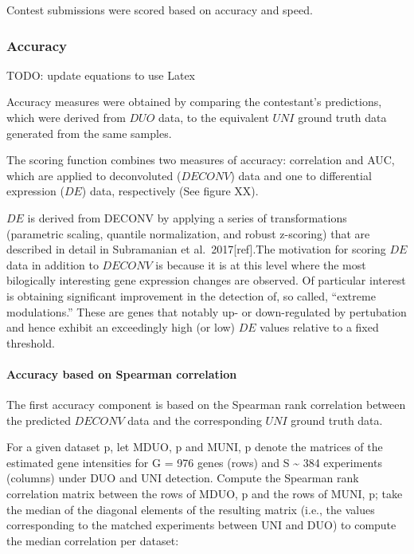 \documentclass[]{article}
\let\oldparagraph\paragraph
\renewcommand{\paragraph}[1]{\oldparagraph{#1}\mbox{}}
\begin{document}
Contest submissions were scored based on accuracy and speed.

\hypertarget{accuracy}{%
\subsubsection{Accuracy}\label{accuracy}}

\color{red}

TODO: update equations to use Latex \color{black}

Accuracy measures were obtained by comparing the contestant's
predictions, which were derived from \(DUO\) data, to the equivalent
\(UNI\) ground truth data generated from the same samples.

The scoring function combines two measures of accuracy: correlation and
AUC, which are applied to deconvoluted (\(DECONV\)) data and one to
differential expression (\(DE\)) data, respectively (See figure XX).

\(DE\) is derived from DECONV by applying a series of transformations
(parametric scaling, quantile normalization, and robust z-scoring) that
are described in detail in Subramanian et al.~2017{[}ref{]}.The
motivation for scoring \(DE\) data in addition to \(DECONV\) is because
it is at this level where the most bilogically interesting gene
expression changes are observed. Of particular interest is obtaining
significant improvement in the detection of, so called, ``extreme
modulations.'' These are genes that notably up- or down-regulated by
pertubation and hence exhibit an exceedingly high (or low) \(DE\) values
relative to a fixed threshold.

\hypertarget{accuracy-based-on-spearman-correlation}{%
\paragraph{Accuracy based on Spearman
correlation}\label{accuracy-based-on-spearman-correlation}}

The first accuracy component is based on the Spearman rank correlation
between the predicted \(DECONV\) data and the corresponding \(UNI\)
ground truth data.

For a given dataset p, let MDUO, p and MUNI, p denote the matrices of
the estimated gene intensities for G = 976 genes (rows) and S
\textasciitilde{} 384 experiments (columns) under DUO and UNI detection.
Compute the Spearman rank correlation matrix between the rows of MDUO, p
and the rows of MUNI, p; take the median of the diagonal elements of the
resulting matrix (i.e., the values corresponding to the matched
experiments between UNI and DUO) to compute the median correlation per
dataset:
\end{document}
